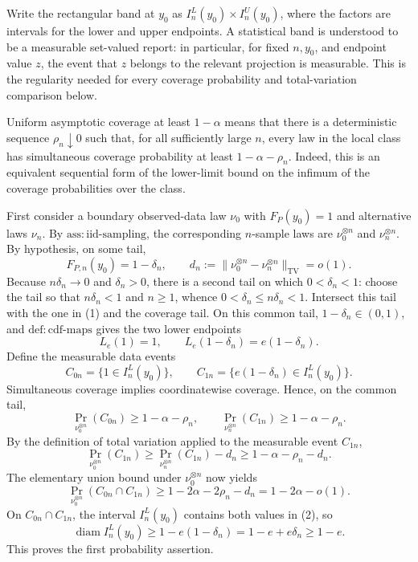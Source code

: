 Write the rectangular band at \(y_0\) as \(I_n^L(y_0)\times I_n^U(y_0)\), where the factors are intervals for the lower and upper endpoints. A statistical band is understood to be a measurable set-valued report: in particular, for fixed \(n,y_0\), and endpoint value \(z\), the event that \(z\) belongs to the relevant projection is measurable. This is the regularity needed for every coverage probability and total-variation comparison below.

Uniform asymptotic coverage at least \(1-\alpha\) means that there is a deterministic sequence \(\rho_n\downarrow0\) such that, for all sufficiently large \(n\), every law in the local class has simultaneous coverage probability at least \(1-\alpha-\rho_n\). Indeed, this is an equivalent sequential form of the lower-limit bound on the infimum of the coverage probabilities over the class.

First consider a boundary observed-data law \(\nu_0\) with \(F_P(y_0)=1\) and alternative laws \(\nu_n\). By \(\mathrm{ass:iid\text{-}sampling}\), the corresponding \(n\)-sample laws are \(\nu_0^{\otimes n}\) and \(\nu_n^{\otimes n}\). By hypothesis, on some tail,
\[
 F_{P,n}(y_0)=1-\delta_n,
 \qquad
 d_n:=\lVert\nu_0^{\otimes n}-\nu_n^{\otimes n}\rVert_{\mathrm{TV}}=o(1).
 \tag{1}
\]
Because \(n\delta_n\to0\) and \(\delta_n>0\), there is a second tail on which \(0<\delta_n<1\): choose the tail so that \(n\delta_n<1\) and \(n\ge1\), whence \(0<\delta_n\le n\delta_n<1\). Intersect this tail with the one in (1) and the coverage tail. On this common tail, \(1-\delta_n\in(0,1)\), and \(\mathrm{def:cdf\text{-}maps}\) gives the two lower endpoints
\[
 L_e(1)=1,
 \qquad
 L_e(1-\delta_n)=e(1-\delta_n).
 \tag{2}
\]
Define the measurable data events
\[
 C_{0n}=\{1\in I_n^L(y_0)\},
 \qquad
 C_{1n}=\{e(1-\delta_n)\in I_n^L(y_0)\}.
\]
Simultaneous coverage implies coordinatewise coverage. Hence, on the common tail,
\[
 \Pr_{\nu_0^{\otimes n}}(C_{0n})\ge1-\alpha-\rho_n,
 \qquad
 \Pr_{\nu_n^{\otimes n}}(C_{1n})\ge1-\alpha-\rho_n.
 \tag{3}
\]
By the definition of total variation applied to the measurable event \(C_{1n}\),
\[
 \Pr_{\nu_0^{\otimes n}}(C_{1n})
 \ge \Pr_{\nu_n^{\otimes n}}(C_{1n})-d_n
 \ge1-\alpha-\rho_n-d_n.
 \tag{4}
\]
The elementary union bound under \(\nu_0^{\otimes n}\) now yields
\[
 \Pr_{\nu_0^{\otimes n}}(C_{0n}\cap C_{1n})
 \ge1-2\alpha-2\rho_n-d_n
 =1-2\alpha-o(1).
 \tag{5}
\]
On \(C_{0n}\cap C_{1n}\), the interval \(I_n^L(y_0)\) contains both values in (2), so
\[
 \operatorname{diam} I_n^L(y_0)
 \ge 1-e(1-\delta_n)
 =1-e+e\delta_n
 \ge1-e.
 \tag{6}
\]
This proves the first probability assertion.

